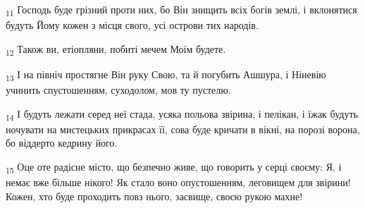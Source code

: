 \begin{tcolorbox}
\textsubscript{11} Господь буде грізний проти них, бо Він знищить всіх богів землі, і вклонятися будуть Йому кожен з місця свого, усі острови тих народів.
\end{tcolorbox}
\begin{tcolorbox}
\textsubscript{12} Також ви, етіопляни, побиті мечем Моїм будете.
\end{tcolorbox}
\begin{tcolorbox}
\textsubscript{13} І на північ простягне Він руку Свою, та й погубить Ашшура, і Ніневію учинить спустошенням, суходолом, мов ту пустелю.
\end{tcolorbox}
\begin{tcolorbox}
\textsubscript{14} І будуть лежати серед неї стада, усяка польова звірина, і пелікан, і їжак будуть ночувати на мистецьких прикрасах її, сова буде кричати в вікні, на порозі ворона, бо віддерто кедрину його.
\end{tcolorbox}
\begin{tcolorbox}
\textsubscript{15} Оце оте радісне місто, що безпечно живе, що говорить у серці своєму: Я, і немає вже більше нікого! Як стало воно опустошенням, леговищем для звірини! Кожен, хто буде проходить повз нього, засвище, своєю рукою махне!
\end{tcolorbox}
